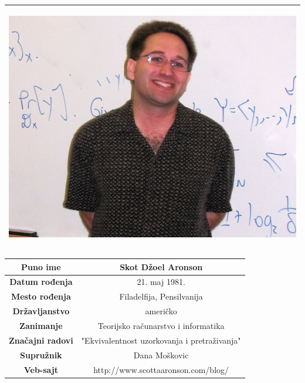\documentclass[a4paper]{article}
\begin{document}
{\begin{table}[h!]
\begin{center}
\begin{tabular}{|p{10.1cm}|}
\begin{center}
\includegraphics[scale=0.4]{Scott Aaronson.jpg}
\end{center}
\\ \hline

\end{tabular}

\hspace*{0.1cm}\begin{tabular}{|c|c|}
\textbf{Puno ime} & Skot Džoel Aronson\\ \hline
\textbf{Datum rođenja} & 21. maj 1981. \\ \hline
\textbf{Mesto rođenja} & Filadelfija, Pensilvanija\\ \hline
\textbf{Državljanstvo} & američko\\ \hline
\textbf{Zanimanje} & Teorijsko računarstvo i informatika\\ \hline
\textbf{Značajni radovi}  & "Ekvivalentnost uzorkovanja i pretraživanja"\\ \hline
\textbf{Supružnik} & Dana Moškovic\\ \hline
\textbf{Veb-sajt} & http://www.scottaaronson.com/blog/ \\ \hline

\end{tabular}


\end{center}
\end{table}

\newpage
}
\end{document}

